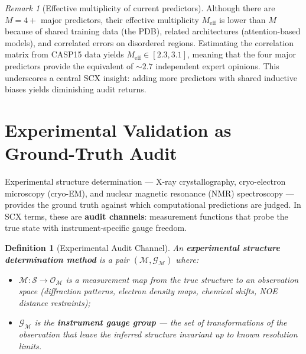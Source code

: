 \documentclass[12pt,a4paper]{article}
\newtheorem{definition}[theorem]{Definition}
\theoremstyle{remark}
\newtheorem{remark}[theorem]{Remark}
\newcommand{\G}{\mathcal{G}}
\newcommand{\Sstruct}{\mathcal{S}}
\begin{document}
\begin{remark}[Effective multiplicity of current predictors]
Although there are $M = 4+$ major predictors, their effective multiplicity $M_{\text{eff}}$ is lower than $M$ because of shared training data (the PDB), related architectures (attention-based models), and correlated errors on disordered regions.
Estimating the correlation matrix from CASP15 data yields $M_{\text{eff}} \in [2.3, 3.1]$, meaning that the four major predictors provide the equivalent of $\sim 2.7$ independent expert opinions.
This underscores a central SCX insight: adding more predictors with shared inductive biases yields diminishing audit returns.
\end{remark}

\section{Experimental Validation as Ground-Truth Audit}
\label{sec:experimental-audit}

Experimental structure determination — X-ray crystallography, cryo-electron microscopy (cryo-EM), and nuclear magnetic resonance (NMR) spectroscopy — provides the ground truth against which computational predictions are judged.
In SCX terms, these are \textbf{audit channels}: measurement functions that probe the true state with instrument-specific gauge freedom.

\begin{definition}[Experimental Audit Channel]
\label{def:exp-channel}
An \textbf{experimental structure determination method} is a pair $(\mathcal{M}, \G_{\mathcal{M}})$ where:
\begin{itemize}[leftmargin=*]
    \item $\mathcal{M}: \Sstruct \to \mathcal{O}_{\mathcal{M}}$ is a measurement map from the true structure to an observation space (diffraction patterns, electron density maps, chemical shifts, NOE distance restraints);
    \item $\G_{\mathcal{M}}$ is the \textbf{instrument gauge group} — the set of transformations of the observation that leave the inferred structure invariant up to known resolution limits.
\end{itemize}
\end{definition}
\end{document}
